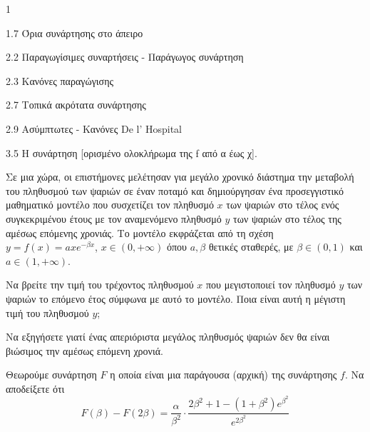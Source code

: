 \begin{ylh}{1}
    \item 1.7 Όρια συνάρτησης στο άπειρο
    \item 2.2 Παραγωγίσιμες συναρτήσεις - Παράγωγος συνάρτηση
    \item 2.3 Κανόνες παραγώγισης
    \item 2.7 Τοπικά ακρότατα συνάρτησης
    \item 2.9 Ασύμπτωτες - Κανόνες De l’ Hospital
    \item 3.5 Η συνάρτηση [ορισμένο ολοκλήρωμα της f από α έως χ].
\end{ylh}
Σε μια χώρα, οι επιστήμονες μελέτησαν για μεγάλο χρονικό διάστημα την μεταβολή του πληθυσμού των ψαριών σε έναν ποταμό και δημιούργησαν ένα προσεγγιστικό μαθηματικό μοντέλο που συσχετίζει τον πληθυσμό $x$ των ψαριών στο τέλος ενός συγκεκριμένου έτους με τον αναμενόμενο πληθυσμό $y$ των ψαριών στο τέλος της αμέσως επόμενης χρονιάς.
Το μοντέλο εκφράζεται από τη σχέση $y = f(x) = axe^{-\beta x}$, $x \in (0, +\infty)$ όπου $a, \beta$ θετικές σταθερές, με $\beta \in (0,1)$ και $a \in (1, +\infty)$.

\begin{alist}
\item Να βρείτε την τιμή του τρέχοντος πληθυσμού $x$ που μεγιστοποιεί τον πληθυσμό $y$ των ψαριών το επόμενο έτος σύμφωνα με αυτό το μοντέλο. Ποια είναι αυτή η μέγιστη τιμή του πληθυσμού $y$; 
\item Να εξηγήσετε γιατί ένας απεριόριστα μεγάλος πληθυσμός ψαριών δεν θα είναι βιώσιμος την αμέσως επόμενη χρονιά. 
\item Θεωρούμε συνάρτηση $F$ η οποία είναι μια παράγουσα (αρχική) της συνάρτησης $f$. Να αποδείξετε ότι
\[ F(\beta) - F(2\beta) = \frac{\alpha}{\beta^2} \cdot \frac{2\beta^2+1-(1+\beta^2)e^{\beta^2}}{e^{2\beta^2}} \] 
\end{alist}